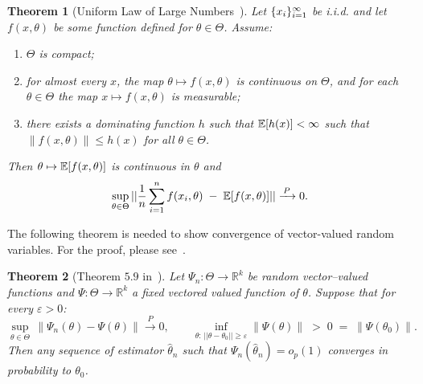 \documentclass[11pt]{article} %
\def\rx{{\textnormal{x}}}
\newcommand{\norm}[1]{||#1||}
\newtheorem{theorem}{Theorem}
\begin{document}
\begin{theorem}[Uniform Law of Large Numbers~\citep{NEWEY19942111}]\label{thm:ulnn}
Let $\{\rx_i\}_{i=1}^\infty$ be i.i.d. and let $f(x, \theta)$ be some function defined for $\theta \in \Theta$. Assume:
\begin{enumerate}
\item $\Theta$ is compact;
\item for almost every $x$, the map $\theta\mapsto f(x,\theta)$ is continuous on $\Theta$, and for each $\theta\in\Theta$ the map $x\mapsto f(x,\theta)$ is measurable;
\item there exists a dominating function $h$ such that $\mathbb E[h(\rx)]<\infty$ such that $\|f(x,\theta)\|\le h(x)$ for all $\theta\in\Theta$.
\end{enumerate}
Then $\theta\mapsto \mathbb E[f(\rx,\theta)]$ is continuous in $\theta$ and
\[
\sup_{\theta\in\Theta}\norm{\frac{1}{n}\sum_{i=1}^n f(\rx_i,\theta)\;-\;\mathbb E[f(\rx,\theta)]} \xrightarrow{\,P\,} 0.
\]
\end{theorem}
The following theorem is needed to show convergence of vector-valued random variables.  For the proof, please see~\citep{Vaart_1998}.
\begin{theorem}[Theorem $5.9$ in~\citep{Vaart_1998}]\label{thm:varrt}
Let $\Psi_n:\Theta\to\mathbb R^k$ be random vector–valued functions and
$\Psi:\Theta\to\mathbb R^k$ a fixed vectored valued function of $\theta$.
Suppose that for every $\varepsilon>0$:
\[
\sup_{\theta\in\Theta}\,\|\Psi_n(\theta)-\Psi(\theta)\|\xrightarrow{\,P\,}0, \qquad \inf_{\theta:\, \norm{\theta - \theta_0}\ge \varepsilon}\|\Psi(\theta)\| \;>\; 0
\;=\; \|\Psi(\theta_0)\|.
\]
Then any sequence of estimator \(\hat \theta_n\) such that \(\Psi_n(\hat\theta_n) = o_p(1)\) converges in probability to \(\theta_0\). 
\end{theorem}
\end{document}
